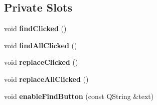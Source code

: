 \subsection*{Private Slots}
\begin{DoxyCompactItemize}
\item 
\hypertarget{class_find_dialog_a655e40bfdcc2c7712a1541bbf8cf2744}{}void {\bfseries find\+Clicked} ()\label{class_find_dialog_a655e40bfdcc2c7712a1541bbf8cf2744}

\item 
\hypertarget{class_find_dialog_aa42a9c9abe4a4ede6d87b2da08b3b928}{}void {\bfseries find\+All\+Clicked} ()\label{class_find_dialog_aa42a9c9abe4a4ede6d87b2da08b3b928}

\item 
\hypertarget{class_find_dialog_ae70c0cd7fbfa8b635e2bf43c34ee6586}{}void {\bfseries replace\+Clicked} ()\label{class_find_dialog_ae70c0cd7fbfa8b635e2bf43c34ee6586}

\item 
\hypertarget{class_find_dialog_abe5173da17631afacde0742e4cd9e471}{}void {\bfseries replace\+All\+Clicked} ()\label{class_find_dialog_abe5173da17631afacde0742e4cd9e471}

\item 
\hypertarget{class_find_dialog_a2f659549e817833ee65d14f81d59cced}{}void {\bfseries enable\+Find\+Button} (const Q\+String \&text)\label{class_find_dialog_a2f659549e817833ee65d14f81d59cced}

\end{DoxyCompactItemize}
